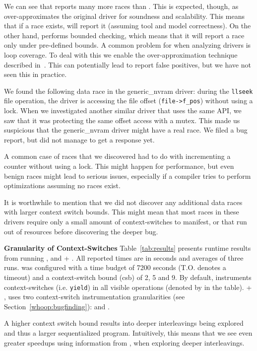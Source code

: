 We can see that \whoop reports many more races than \corral. This is expected, though, as \whoop over-approximates the original driver for soundness and scalability. This means that if a race exists, \whoop will report it (assuming tool and model correctness). On the other hand, \corral performs bounded checking, which means that it will report a race only under pre-defined bounds. A common problem for \corral when analyzing drivers is loop coverage. To deal with this we enable the over-approximation technique described in~\cite{lal2014powering}. This can potentially lead \corral to report false positives, but we have not seen this in practice.

We found the following data race in the generic\_nvram driver: during the \texttt{llseek} file operation, the driver is accessing the file offset (\texttt{file->f\_pos}) without using a lock. When we investigated another similar driver that uses the same API, we saw that it was protecting the same offset access with a mutex. This made us suspicious that the generic\_nvram driver might have a real race. We filed a bug report, but did not manage to get a response yet.

A common case of races that we discovered had to do with incrementing a counter without using a lock. This might happen for performance, but even benign races might lead to serious issues, especially if a compiler tries to perform optimizations assuming no races exist.

It is worthwhile to mention that we did not discover any additional data races with larger context switch bounds. This might mean that most races in these drivers require only a small amount of context-switches to manifest, or that \corral run out of resources before discovering the deeper bug.

\noindent
\textbf{Granularity of Context-Switches}\xspace\xspace Table~\ref{tab:results} presents runtime results from running \whoop, \corral and \whoop + \corral. All reported times are in seconds and averages of three runs. \corral was configured with a time budget of 7200 seconds (T.O. denotes a timeout) and a context-switch bound (csb) of 2, 5 and 9. By default, \corral instruments context-switches (i.e. \texttt{yield}) in all visible operations (denoted by \yieldall in the table). \whoop + \corral, uses two context-switch instrumentation granularities (see Section~\ref{whoop:bugfinding}): \yieldcoarse and \yieldmr.

A higher context switch bound results into deeper interleavings being explored and thus a larger sequentialized program. Intuitively, this means that we see even greater speedups using information from \whoop, when exploring deeper interleavings.

